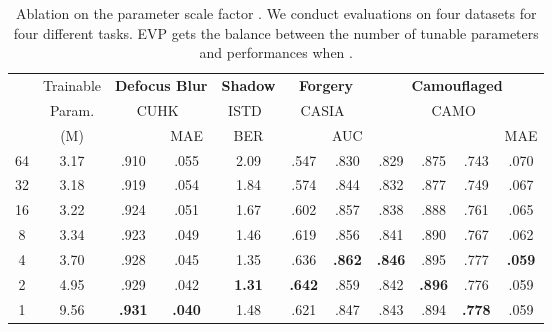 \begin{table*}[!t]
\centering
{
\begin{tabular}{c||c|cc|c|cc|cccc}
\toprule
\multirow{3}{*}{}& Trainable & \multicolumn{2}{c|}{\textbf{Defocus Blur}} & \textbf{Shadow} & \multicolumn{2}{c|}{\textbf{Forgery }} & \multicolumn{4}{c}{\textbf{Camouflaged}}\\
      & Param.&  \multicolumn{2}{c|}{CUHK~\cite{shi2014discriminative}} & ISTD~\cite{wang2018stacked}& \multicolumn{2}{c|}{CASIA~\cite{dong2013casia}} & \multicolumn{4}{c}{CAMO~\cite{le2019anabranch}}\\ 
      & (M) & & MAE       & BER     &  & AUC   &  &    &   & MAE    \\ \hline
64 & 3.17 & .910 & .055 & 2.09  & .547 & .830  & .829 & .875 & .743 & .070 \\ 
32 & 3.18 & .919 & .054 & 1.84  & .574 & .844  & .832 & .877 & .749 & .067 \\ 
16  & 3.22 & .924  & .051  & 1.67 & .602 & .857 & .838 & .888 & .761 & .065 \\
8  & 3.34 & .923  & .049  & 1.46 & .619 & .856 & .841 & .890 & .767 & .062 \\
4 & 3.70 & .928  & .045   & 1.35 & .636   & \bf.862 & \bf.846 & .895 & .777 & \bf.059 \\
2 & 4.95 & .929  & .042   & \bf1.31 & \bf.642   & .859 & .842 & \bf.896 & .776 & .059 \\ 
1 & 9.56 & \bf.931  & \bf.040   & 1.48 & .621   & .847 & .843 & .894 & \bf.778 & .059 \\ \bottomrule
\end{tabular}}
\caption{Ablation on the parameter scale factor . We conduct evaluations on four datasets for four different tasks. EVP gets the balance between the number of tunable parameters and performances when .}
\label{tab:model_size}
\end{table*}


